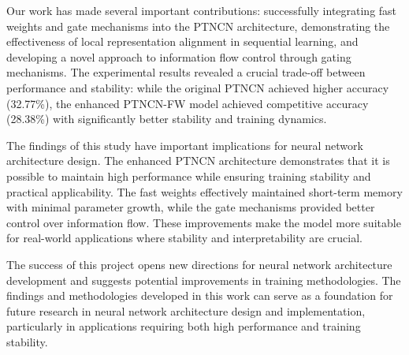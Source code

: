 \documentclass{article}
\begin{document}
Our work has made several important contributions: successfully integrating fast weights and gate mechanisms into the PTNCN architecture, demonstrating the effectiveness of local representation alignment in sequential learning, and developing a novel approach to information flow control through gating mechanisms. The experimental results revealed a crucial trade-off between performance and stability: while the original PTNCN achieved higher accuracy (32.77\%), the enhanced PTNCN-FW model achieved competitive accuracy (28.38\%) with significantly better stability and training dynamics.

The findings of this study have important implications for neural network architecture design. The enhanced PTNCN architecture demonstrates that it is possible to maintain high performance while ensuring training stability and practical applicability. The fast weights effectively maintained short-term memory with minimal parameter growth, while the gate mechanisms provided better control over information flow. These improvements make the model more suitable for real-world applications where stability and interpretability are crucial.

The success of this project opens new directions for neural network architecture development and suggests potential improvements in training methodologies. The findings and methodologies developed in this work can serve as a foundation for future research in neural network architecture design and implementation, particularly in applications requiring both high performance and training stability.
\end{document}
